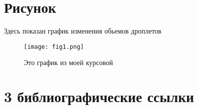 \documentclass{article}
\begin{document}
\section{Рисунок}
Здесь показан график изменения обьемов дроплетов 

\begin{figure}[H]
\centering
\texttt{[image: fig1.png]}
\caption{\label{fig:fig1}Это график из моей курсовой}
\end{figure}

\section{3 библиографические ссылки}


\end{document}

